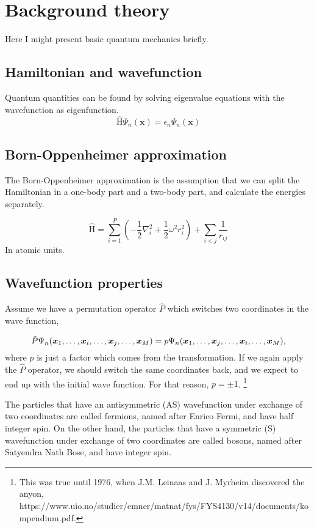 \section{Background theory}
Here I might present basic quantum mechanics briefly.

\subsection{Hamiltonian and wavefunction}
Quantum quantities can be found by solving eigenvalue equations with the wavefunction as eigenfunction. 
\begin{equation}
\label{eq:Energy}
\hat{\text{H}}\Psi_n(\boldsymbol{x})=\epsilon_n\Psi_n(\boldsymbol{x})
\end{equation}


\subsection{Born-Oppenheimer approximation}
The Born-Oppenheimer approximation is the assumption that we can split the Hamiltonian in a one-body part and a two-body part, and calculate the energies separately. 

\begin{equation}
\label{eq:Hamiltonian}
\hat{\text{H}} = \sum_{i=1}^{P} (-\frac{1}{2} \nabla_i^2 + \frac{1}{2} \omega^2 r_i ^2) + \sum_{i<j} \frac{1}{r_{ij}} 
\end{equation}
In atomic units. 

\subsection{Wavefunction properties}
Assume we have a permutation operator $\hat{P}$ which switches two coordinates in the wave function,

\begin{equation}
\hat{P}\Psi_n(\boldsymbol{x}_1,\hdots,\boldsymbol{x}_i,\hdots,\boldsymbol{x}_j,\hdots,\boldsymbol{x}_M)=p\Psi_n(\boldsymbol{x}_1,\hdots,\boldsymbol{x}_j,\hdots,\boldsymbol{x}_i,\hdots,\boldsymbol{x}_M),
\end{equation}
where $p$ is just a factor which comes from the transformation. If we again apply the $\hat{P}$ operator, we should switch the same coordinates back, and we expect to end up with the initial wave function. For that reason, $p=\pm1$. \footnote{This was true until 1976, when J.M. Leinaas and J. Myrheim discovered the anyon, https://www.uio.no/studier/emner/matnat/fys/FYS4130/v14/documents/kompendium.pdf.}

The particles that have an antisymmetric (AS) wavefunction under exchange of two coordinates are called fermions, named after Enrico Fermi, and have half integer spin. On the other hand, the particles that have a symmetric (S) wavefunction under exchange of two coordinates are called bosons, named after Satyendra Nath Bose, and have integer spin. 


